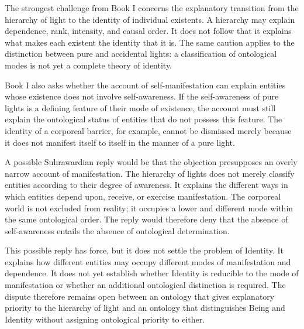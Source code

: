 The strongest challenge from Book I concerns
the explanatory transition from
the hierarchy of light to the
identity of individual existents.
A hierarchy may explain dependence,
rank, intensity, and causal order.
It does not follow that it
explains what makes each
existent the identity that
it is. The same caution
applies to the distinction
between pure and accidental
lights: a classification
of ontological modes is
not yet a complete theory
of identity.

\label{para:VS.B01.P01.C08.S14.SS18.P002}

Book I also asks whether the account
of self-manifestation can
explain entities whose
existence does not involve
self-awareness. If the
self-awareness of pure
lights is a defining
feature of their mode
of existence, the account
must still explain the
ontological status of
entities that do not
possess this feature.
The identity of a corporeal
barrier, for example,
cannot be dismissed merely
because it does not
manifest itself to itself
in the manner of a pure
light.

\label{para:VS.B01.P01.C08.S14.SS18.P003}

A possible Suhrawardian reply would be that
the objection presupposes
an overly narrow account
of manifestation. The
hierarchy of lights does
not merely classify
entities according to
their degree of awareness.
It explains the different
ways in which entities
depend upon, receive,
or exercise manifestation.
The corporeal world is
not excluded from reality;
it occupies a lower and
different mode within
the same ontological order.
The reply would therefore
deny that the absence
of self-awareness entails
the absence of ontological
determination.

\label{para:VS.B01.P01.C08.S14.SS18.P004}

This possible reply has force,
but it does not settle
the problem of Identity.
It explains how different
entities may occupy
different modes of
manifestation and
dependence. It does
not yet establish whether
Identity is reducible
to the mode of manifestation
or whether an additional
ontological distinction
is required. The dispute
therefore remains open
between an ontology
that gives explanatory
priority to the hierarchy
of light and an ontology
that distinguishes Being
and Identity without
assigning ontological
priority to either.

